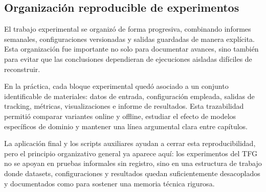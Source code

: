 \documentclass[../MAIN.tex]{subfiles}
\begin{document}
	\subsection{Organización reproducible de experimentos}
	
	El trabajo experimental se organizó de forma progresiva, combinando informes semanales, configuraciones versionadas y salidas guardadas de manera explícita. Esta organización fue importante no solo para documentar avances, sino también para evitar que las conclusiones dependieran de ejecuciones aisladas difíciles de reconstruir.
	
	En la práctica, cada bloque experimental quedó asociado a un conjunto identificable de materiales: datos de entrada, configuración empleada, salidas de tracking, métricas, visualizaciones e informe de resultados. Esta trazabilidad permitió comparar variantes online y offline, estudiar el efecto de modelos específicos de dominio y mantener una línea argumental clara entre capítulos.
	
	La aplicación final y los scripts auxiliares ayudan a cerrar esta reproducibilidad, pero el principio organizativo general ya aparece aquí: los experimentos del TFG no se apoyan en pruebas informales sin registro, sino en una estructura de trabajo donde datasets, configuraciones y resultados quedan suficientemente desacoplados y documentados como para sostener una memoria técnica rigurosa.
	
	\newpage
	
\end{document}

